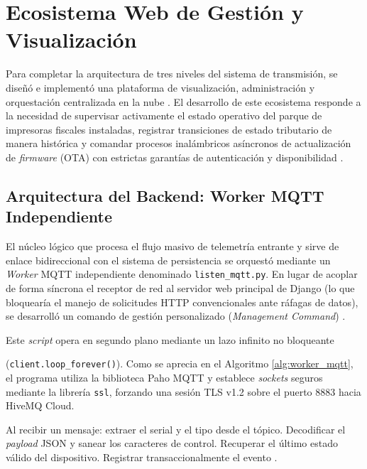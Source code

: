 \section{Ecosistema Web de Gestión y Visualización}

\par Para completar la arquitectura de tres niveles del sistema de transmisión, se diseñó e implementó una plataforma de visualización, administración y orquestación centralizada en la nube \cite{Connected_Everything_2016}. El desarrollo de este ecosistema responde a la necesidad de supervisar activamente el estado operativo del parque de impresoras fiscales instaladas, registrar transiciones de estado tributario de manera histórica y comandar procesos inalámbricos asíncronos de actualización de \textit{firmware} (OTA) con estrictas garantías de autenticación y disponibilidad \cite{WEF_IIoT_2018}.

\subsection{Arquitectura del Backend: Worker MQTT Independiente}

\par El núcleo lógico que procesa el flujo masivo de telemetría entrante y sirve de enlace bidireccional con el sistema de persistencia se orquestó mediante un \textit{Worker} MQTT independiente denominado \texttt{listen\_mqtt.py}. En lugar de acoplar de forma síncrona el receptor de red al servidor web principal de Django (lo que bloquearía el manejo de solicitudes HTTP convencionales ante ráfagas de datos), se desarrolló un comando de gestión personalizado (\textit{Management Command}) \cite{Django_v5_Doc}. \\

\par Este \textit{script} opera en segundo plano mediante un lazo infinito no bloqueante 

\noindent (\texttt{client.loop\_forever()}). Como se aprecia en el Algoritmo \ref{alg:worker_mqtt}, el programa utiliza la biblioteca Paho MQTT y establece \textit{sockets} seguros mediante la librería \texttt{ssl}, forzando una sesión TLS v1.2 sobre el puerto 8883 hacia HiveMQ Cloud.

\begin{algorithm}[htbp]
\caption{Lógica de recepción, trazabilidad y manejo del testamento (LWT) en el \textit{worker} MQTT.}
\label{alg:worker_mqtt}
\begin{algorithmic}[1]
\State Al recibir un mensaje: extraer el serial y el tipo desde el tópico.
\State Decodificar el \textit{payload} JSON y sanear los caracteres de control.
    \State Recuperar el último estado válido del dispositivo.
    \State Registrar transaccionalmente el evento .
\EndIf
\end{algorithmic}
\end{algorithm}

